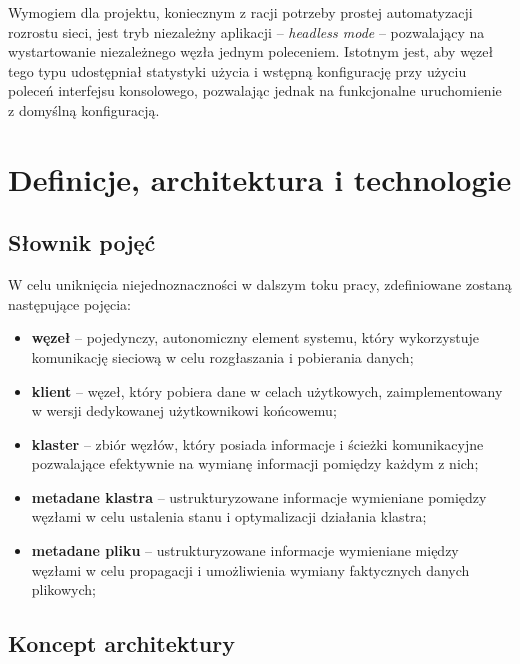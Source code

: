 Wymogiem dla projektu, koniecznym z racji potrzeby prostej automatyzacji rozrostu sieci, jest tryb niezależny aplikacji -- {\em headless mode} -- pozwalający na wystartowanie niezależnego węzła jednym poleceniem. Istotnym jest, aby węzeł tego typu udostępniał statystyki użycia i wstępną konfigurację przy użyciu poleceń interfejsu konsolowego, pozwalając jednak na funkcjonalne uruchomienie z domyślną konfiguracją.


\section{Definicje, architektura i technologie}
\label{sec:zalozeniaProjektu}

\subsection{Słownik pojęć}

W celu uniknięcia niejednoznaczności w dalszym toku pracy, zdefiniowane zostaną następujące pojęcia:

\begin{itemize}
    \item \textbf{węzeł} -- pojedynczy, autonomiczny element systemu, który wykorzystuje komunikację sieciową w celu rozgłaszania i pobierania danych;
    \item \textbf{klient} -- węzeł, który pobiera dane w celach użytkowych, zaimplementowany w wersji dedykowanej użytkownikowi końcowemu;
    \item \textbf{klaster} -- zbiór węzłów, który posiada informacje i ścieżki komunikacyjne pozwalające efektywnie na wymianę informacji pomiędzy każdym z nich;
    \item \textbf{metadane klastra} -- ustrukturyzowane informacje wymieniane pomiędzy węzłami w celu ustalenia stanu i optymalizacji działania klastra;
    \item \textbf{metadane pliku} -- ustrukturyzowane informacje wymieniane między węzłami w celu propagacji i umożliwienia wymiany faktycznych danych plikowych;
\end{itemize}

\subsection{Koncept architektury}

